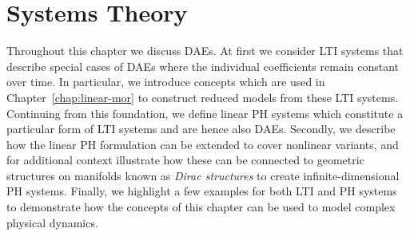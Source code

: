 \chapter{Systems Theory}\label{chap:systems-theory}

Throughout this chapter we discuss \acp{DAE}.
At first we consider \ac{LTI} systems that describe special cases of \acp{DAE} where the individual coefficients remain constant over time.
In particular, we introduce concepts which are used in Chapter~\ref{chap:linear-mor} to construct reduced models from these \ac{LTI} systems.
Continuing from this foundation, we define linear \ac{PH} systems which constitute a particular form of \ac{LTI} systems and are hence also \acp{DAE}.
Secondly, we describe how the linear \ac{PH} formulation can be extended to cover nonlinear variants, and for additional context illustrate how these can be connected to geometric structures on manifolds known as \emph{Dirac structures} to create infinite-dimensional \ac{PH} systems.
Finally, we highlight a few examples for both \ac{LTI} and \ac{PH} systems to demonstrate how the concepts of this chapter can be used to model complex physical dynamics.




